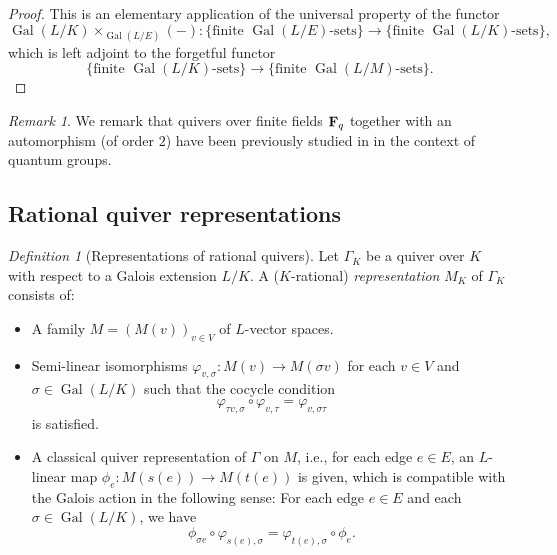 \documentclass[a4paper,12pt,reqno]{amsart}
\newcommand{\FF}{{\rm\bf F}}
\DeclareMathOperator{\Gal}{\mathrm {Gal}}
\theoremstyle{plain}
\theoremstyle{remark}
\newtheorem{remark}[theorem]{Remark}
\newtheorem{definition}[theorem]{Definition}
\begin{document}
\begin{proof}
  This is an elementary application of the universal property of the functor
  \[
  \Gal(L/K)\times_{\Gal(L/E)}(-)\colon \{\text{finite $\Gal(L/E)$-sets}\}\to\{\text{finite $\Gal(L/K)$-sets}\},
  \]
  which is left adjoint to the forgetful functor
  \[
  \{\text{finite $\Gal(L/K)$-sets}\}\to\{\text{finite $\Gal(L/M)$-sets}\}.
  \]
\end{proof}

\begin{remark}
  We remark that quivers over finite fields $\FF_q$ together with an automorphism (of order $2$) have been previously studied in \cite{DengDuParshallWang2008} in the context of quantum groups.
\end{remark}

\subsection{Rational quiver representations}\label{sec:rationalquiverrepresentations}

  \begin{definition}[Representations of rational quivers]\label{def:rationalrepresentations}
    Let $\Gamma_K$ be a quiver over $K$ with respect to a Galois extension $L/K$. A ($K$-rational) {\em representation} $M_K$ of $\Gamma_K$ consists of:
    \begin{itemize}
    \item[(i)]
      A family $M=(M(v))_{v\in V}$ of $L$-vector spaces.
    \item[(ii)] Semi-linear isomorphisms $\varphi_{v,\sigma}\colon M(v)\to M(\sigma v)$ for each $v\in V$ and $\sigma\in\Gal(L/K)$ such that the cocycle condition
      \begin{equation}
        \varphi_{\tau v,\sigma}\circ\varphi_{v,\tau}=\varphi_{v,\sigma\tau}
        \label{eq:semi-linearactiononrep}
      \end{equation}
      is satisfied.
    \item[(iii)] A classical quiver representation of $\Gamma$ on $M$, i.e., for each edge $e\in E$, an $L$-linear map $\phi_e\colon M(s(e))\to M(t(e))$ is given, which is compatible with the Galois action in the following sense:
      For each edge $e\in E$ and each $\sigma\in\Gal(L/K)$, we have
      \begin{equation}
        \phi_{\sigma e}\circ\varphi_{s(e),\sigma}=\varphi_{t(e),\sigma}\circ\phi_e.
        \label{eq:koecheractiononrep}
      \end{equation}
    \end{itemize}
  \end{definition}
\end{document}

